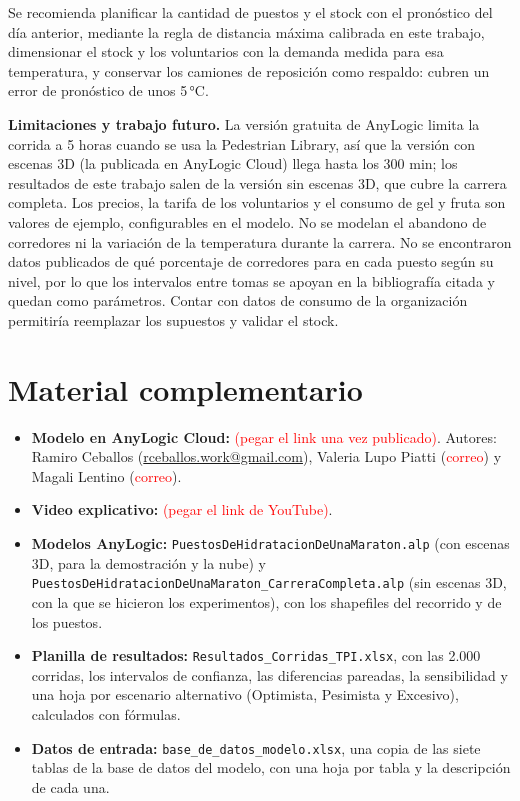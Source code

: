 \documentclass[11pt,a4paper]{article}
\newcommand{\completar}[1]{\textcolor{red}{#1}}
\begin{document}
Se recomienda planificar la cantidad de puestos y el stock con el pronóstico del día anterior, mediante la regla de distancia máxima calibrada en este trabajo, dimensionar el stock y los voluntarios con la demanda medida para esa temperatura, y conservar los camiones de reposición como respaldo: cubren un error de pronóstico de unos 5\,°C.

\textbf{Limitaciones y trabajo futuro.} La versión gratuita de AnyLogic limita la corrida a 5 horas cuando se usa la Pedestrian Library, así que la versión con escenas 3D (la publicada en AnyLogic Cloud) llega hasta los 300 min; los resultados de este trabajo salen de la versión sin escenas 3D, que cubre la carrera completa. Los precios, la tarifa de los voluntarios y el consumo de gel y fruta son valores de ejemplo, configurables en el modelo. No se modelan el abandono de corredores ni la variación de la temperatura durante la carrera. No se encontraron datos publicados de qué porcentaje de corredores para en cada puesto según su nivel, por lo que los intervalos entre tomas se apoyan en la bibliografía citada y quedan como parámetros. Contar con datos de consumo de la organización permitiría reemplazar los supuestos y validar el stock.

\section*{Material complementario}

\begin{itemize}
    \item \textbf{Modelo en AnyLogic Cloud:} \completar{(pegar el link una vez publicado)}. Autores: Ramiro Ceballos (\href{mailto:rceballos.work@gmail.com}{rceballos.work@gmail.com}), Valeria Lupo Piatti (\completar{correo}) y Magali Lentino (\completar{correo}).
    \item \textbf{Video explicativo:} \completar{(pegar el link de YouTube)}.
    \item \textbf{Modelos AnyLogic:} \texttt{PuestosDeHidratacionDeUnaMaraton.alp} (con escenas 3D, para la demostración y la nube) y \texttt{PuestosDeHidratacionDeUnaMaraton\_CarreraCompleta.alp} (sin escenas 3D, con la que se hicieron los experimentos), con los shapefiles del recorrido y de los puestos.
    \item \textbf{Planilla de resultados:} \texttt{Resultados\_Corridas\_TPI.xlsx}, con las 2.000 corridas, los intervalos de confianza, las diferencias pareadas, la sensibilidad y una hoja por escenario alternativo (Optimista, Pesimista y Excesivo), calculados con fórmulas.
    \item \textbf{Datos de entrada:} \texttt{base\_de\_datos\_modelo.xlsx}, una copia de las siete tablas de la base de datos del modelo, con una hoja por tabla y la descripción de cada una.
\end{itemize}
\end{document}
